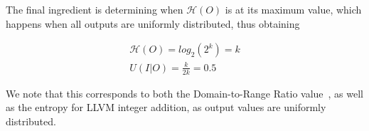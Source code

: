 \documentclass[a4paper]{article}
\newcommand{\entropy}[1]{\mathcal{H}(#1)}
\begin{document}
The final ingredient is determining when \(\entropy{O}\) is at its maximum value, which happens when all outputs are uniformly distributed, thus obtaining

\begin{gather}
    \entropy{O} = log_2(2^k) = k \\
    U(I|O) = \frac{k}{2k} = 0.5
\end{gather}

We note that this corresponds to both the Domain-to-Range Ratio value~\cite{woodward2000testability}, as well as the entropy for LLVM integer addition, as output values are uniformly distributed.



\end{document}
